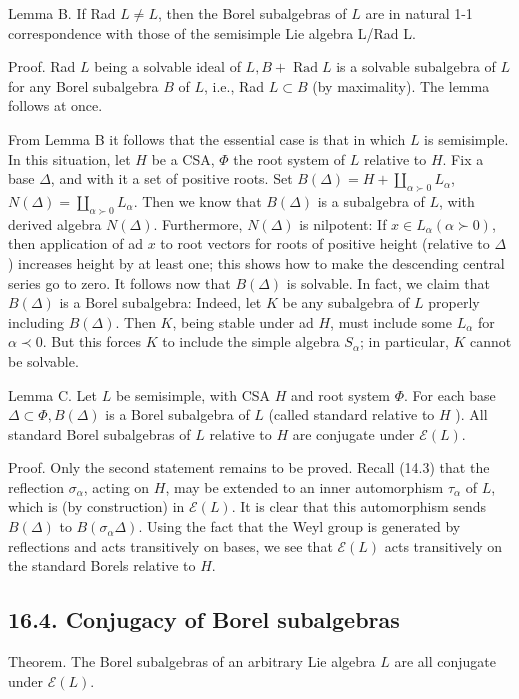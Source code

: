 \documentclass[10pt]{article}
\begin{document}
Lemma B. If Rad $L \neq L$, then the Borel subalgebras of $L$ are in natural 1-1 correspondence with those of the semisimple Lie algebra L/Rad L.

Proof. Rad $L$ being a solvable ideal of $L, B+\operatorname{Rad} L$ is a solvable subalgebra of $L$ for any Borel subalgebra $B$ of $L$, i.e., Rad $L \subset B$ (by maximality). The lemma follows at once.

From Lemma B it follows that the essential case is that in which $L$ is semisimple. In this situation, let $H$ be a CSA, $\Phi$ the root system of $L$ relative to $H$. Fix a base $\Delta$, and with it a set of positive roots. Set $B(\Delta)=H+\coprod_{\alpha \succ 0} L_{\alpha}$, $N(\Delta)=\coprod_{\alpha \succ 0} L_{\alpha}$. Then we know that $B(\Delta)$ is a subalgebra of $L$, with derived algebra $N(\Delta)$. Furthermore, $N(\Delta)$ is nilpotent: If $x \in L_{\alpha}(\alpha \succ 0)$, then application of ad $x$ to root vectors for roots of positive height (relative to $\Delta$ ) increases height by at least one; this shows how to make the descending central series go to zero. It follows now that $B(\Delta)$ is solvable. In fact, we claim that $B(\Delta)$ is a Borel subalgebra: Indeed, let $K$ be any subalgebra of $L$ properly including $B(\Delta)$. Then $K$, being stable under ad $H$, must include some $L_{\alpha}$ for $\alpha \prec 0$. But this forces $K$ to include the simple algebra $S_{\alpha}$; in particular, $K$ cannot be solvable.

Lemma C. Let $L$ be semisimple, with CSA $H$ and root system $\Phi$. For each base $\Delta \subset \Phi, B(\Delta)$ is a Borel subalgebra of $L$ (called standard relative to $H$ ). All standard Borel subalgebras of $L$ relative to $H$ are conjugate under $\mathscr{E}(L)$.

Proof. Only the second statement remains to be proved. Recall (14.3) that the reflection $\sigma_{\alpha}$, acting on $H$, may be extended to an inner automorphism $\tau_{\alpha}$ of $L$, which is (by construction) in $\mathscr{E}(L)$. It is clear that this automorphism sends $B(\Delta)$ to $B\left(\sigma_{\alpha} \Delta\right)$. Using the fact that the Weyl group is generated by reflections and acts transitively on bases, we see that $\mathscr{E}(L)$ acts transitively on the standard Borels relative to $H$.

\subsection*{16.4. Conjugacy of Borel subalgebras}
Theorem. The Borel subalgebras of an arbitrary Lie algebra $L$ are all conjugate under $\mathscr{E}(L)$.
\end{document}
